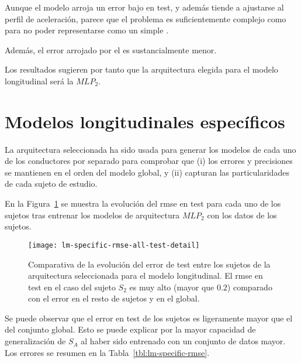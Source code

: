 Aunque el modelo arroja un error bajo en test, y además tiende a ajustarse al perfil de aceleración, parece que el problema es suficientemente complejo como para no poder representarse como un simple .

Además, el error arrojado por el  es sustancialmente menor.

Los resultados sugieren por tanto que la arquitectura elegida para el modelo longitudinal será la $MLP_2$.

\section{Modelos longitudinales específicos}

La arquitectura seleccionada ha sido usada para generar los modelos de cada uno de los conductores por separado para comprobar que (i) los errores y precisiones se mantienen en el orden del modelo global, y (ii) capturan las particularidades de cada sujeto de estudio.

En la Figura~\ref{fig:lm-specific-training-validation-and-test-comparison} se muestra la evolución del \gls{rmse} en test para cada uno de los sujetos tras entrenar los modelos de arquitectura $MLP_2$ con los datos de los sujetos.

\begin{figure}
	\centering
	\texttt{[image: lm-specific-rmse-all-test-detail]}
	\caption[Comparativa de la evolución del \gls{rmse} en test para los sujetos de la arquitectura seleccionada para el modelo longitudinal]{Comparativa de la evolución del error de test entre los sujetos de la arquitectura seleccionada para el modelo longitudinal. El \gls{rmse} en test en el caso del sujeto $S_2$ es muy alto (mayor que $0.2$) comparado con el error en el resto de sujetos y en el global.}
	\label{fig:lm-specific-training-validation-and-test-comparison}
\end{figure}

Se puede observar que el error en test de los sujetos es ligeramente mayor que el del conjunto global. Esto se puede explicar por la mayor capacidad de generalización de $S_A$ al haber sido entrenado con un conjunto de datos mayor. Los errores se resumen en la Tabla~\ref{tbl:lm-specific-rmse}.


